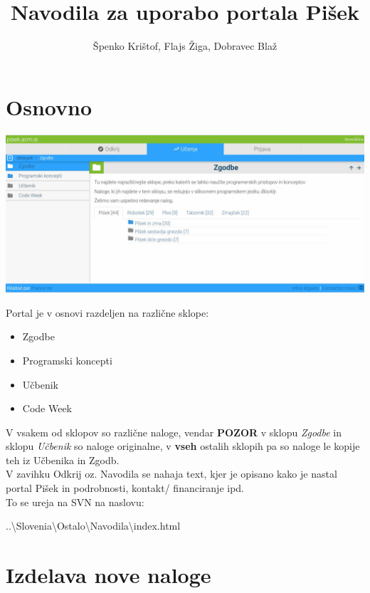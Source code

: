 \documentclass[11pt]{article} %
\title{Navodila za uporabo portala Pišek}
\author{Špenko Krištof, Flajs Žiga, Dobravec Blaž}
\begin{document}
\maketitle

\pagebreak
\tableofcontents
\pagebreak
\section{Osnovno}

\includegraphics[width=\textwidth]{Portal_stran}

Portal je v osnovi razdeljen na različne sklope:
\begin{itemize}
\item Zgodbe
\item Programski koncepti
\item Učbenik
\item Code Week
\end{itemize}

V vsakem od sklopov so različne naloge, vendar \textbf{POZOR} v sklopu \textit{Zgodbe} in sklopu \textit{Učbenik} so naloge originalne, v \textbf{vseh} ostalih sklopih pa so naloge le kopije teh iz Učbenika in Zgodb.\\

V zavihku Odkrij oz. Navodila se nahaja text, kjer je opisano kako je nastal portal Pišek in podrobnosti, kontakt/ financiranje ipd.\\
To se ureja na SVN na naslovu:
\begin{center}
..\textbackslash Slovenia\textbackslash Ostalo\textbackslash Navodila\textbackslash index.html
\end{center}

\pagebreak
\section{Izdelava nove naloge}
\end{document}
